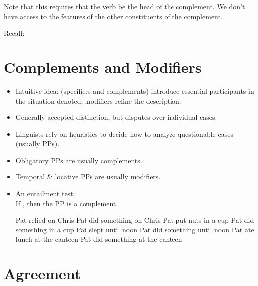 \documentclass[a4paper,landscape,headrule,footrule]{foils}
\begin{document}
Note that this requires that the verb be the head of the
complement. We don’t have access to the features of the other
constituents of the complement.

\begin{center}\small
  Recall: 
\end{center}

\section{Complements and Modifiers}

\begin{itemize}
\item Intuitive idea:  (specifiers and complements) introduce
essential participants in the situation denoted;
modifiers refine the description.
\item Generally accepted distinction, but disputes
over individual cases.
\item Linguists rely on heuristics to decide how to
analyze questionable cases (usually PPs).
\end{itemize}


\begin{itemize}
\item Obligatory PPs are usually complements.
\item Temporal \& locative PPs are usually modifiers.
\item An entailment test:
\\ If , then the PP is a complement.
\begin{exe}
  \ix Pat relied on Chris    \ngv Pat did something on Chris
  \ix Pat put nuts in a cup  \ngv Pat did something in a cup
  \ix Pat slept until noon   \ent Pat did something until noon
  \ix Pat ate lunch at the canteen \ent Pat did something at the canteen
  \end{exe}
\end{itemize}

\section{Agreement}
\end{document}
